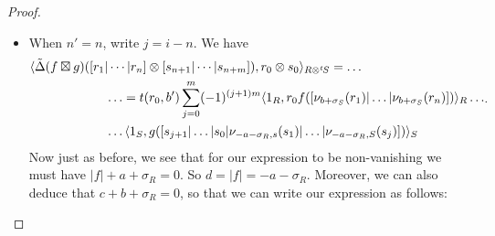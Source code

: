 \documentclass{article}
\newcommand{\ten}{\otimes}
\newcommand{\twisten}{\otimes^t\hspace{-1pt}}
\newcommand{\bv}{\operatorname{BV}}
\newcommand{\elr}{[r_1 | \cdots | r_n]}
\newcommand{\els}{[s_{n+1} | \cdots |s_{n+m}]}
\theoremstyle{plain}
\theoremstyle{definition}
\begin{document}
\begin{proof}
\begin{pfparts}
\begin{itemize}
$$\begin{aligned}
\ldots = &(-1)^mt(r_0,b')\sum_{i=0}^n (-1)^{(i+1)n}\langle 1_{R}, f([r_{i+1} | \ldots | r_0 | \nu_{b+ \sigma_S, R}(r_1) | \ldots | \nu_{b+ \sigma_S, R} (r_i)])  \rangle_R \ldots \\ 
& \hspace{20pt}\ldots\langle 1_S, g( \els)s_0 \rangle_S \end{aligned} $$
Crucially, we notice that this vanishes when
$$\langle 1_S , g( \els)s_0 \rangle_S = \langle g(\els), s_0 \rangle = 0.$$
Thus, we know we can assume $|s_0| + |g(\els)| + \sigma_S =0_S$. But we also know that $g$ is of degree $c$, so that this tells us
$$|s_0| + |\els| + c + \sigma_S =0_S$$
So that $b + \sigma_S = -c$, and by our previous discussion we can write this
$$\begin{aligned} &\langle \tilde{\Delta}(f \boxtimes g)(\elr \ten \els),r_0 \otimes s_0 \rangle_{R \twisten S}=  \ldots \\
&\hspace{30pt}\ldots = (-1)^m t(r_0,b'+c) \langle  \Delta_{c}(f)(\elr), r_0 \rangle_R \langle g( \els)s_0,  1\rangle_S \\
&\hspace{30pt} \ldots =(-1)^m\langle \Delta_c(f)([r_1 | \ldots | r_n]) \otimes g(\els), r_0 \otimes s_0 \rangle \end{aligned} $$
where the twisting factor or $t(r_0,c)$ comes from the form of the twisted $\bv$-operator. So crucially, as $r_0$, $s_0$ can vary over all of $R$, $S$ we have when $n'=n+1$
$$\tilde{\Delta}(f \boxtimes g)= (-1)^{n'm'}\Delta_c(f) \boxtimes g$$
where the minus sign comes from the form of the box product.
\item When $n'=n$, write $j=i-n$. We have
$$\begin{aligned} &\langle \tilde{\Delta}(f \boxtimes g)([r_1 | \cdots | r_n] \ten \els), r_0 \otimes s_0 \rangle_{R \twisten S}= \ldots \\
&\hspace{60pt}\ldots =t(r_0,b')\sum_{j=0}^m (-1)^{(j+1)m} \langle 1_R, r_0 f([\nu_{b+\sigma_S}(r_1) | \ldots | \nu_{b+\sigma_S}(r_n)]) \rangle_R  \ldots \\
&\hspace{60pt}\ldots \langle 1_S, g([s_{j+1} | \ldots | s_0 | \nu_{-a-\sigma_R, s}(s_1) | \ldots | \nu_{-a-\sigma_R,S} (s_{j})]) \rangle_S \end{aligned}. $$
Now just as before, we see that for our expression to be non-vanishing we must have $|f| + a + \sigma_R = 0$. So $d = |f| = -a - \sigma_R$. Moreover, we can also deduce that $c+b+\sigma_R=0$, so that we can write our expression as follows:

\end{itemize}
\end{pfparts}
\end{proof}
\end{document}
